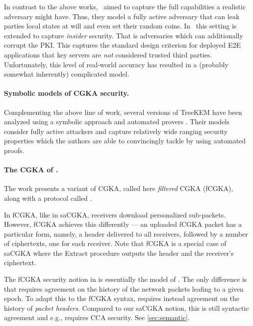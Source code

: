 In contrast to the above works,~\cite{TCC:ACJM20} aimed to capture the full
capabilities a realistic adversary might have. Thus, they model a fully
active adversary that can leak parties local states at will and even set
their random coins. In~\cite{EPRINT:AlwJosMul20} this setting is extended to
capture \emph{insider} security. That is adversaries which can additionally
corrupt the PKI. This captures the standard design criterion for deployed E2E
applications that key servers are \emph{not} considered trusted third
parties. Unfortunately, this level of real-world accuracy has resulted in a
(probably somewhat inherently) complicated model.

\paragraph{Symbolic models of CGKA security.}
Complementing the above line of work, several versions of TreeKEM have been
analyzed using a symbolic approach and automated provers
\cite{bhargavan:hal-02425229}. Their models consider fully active attackers
and capture relatively wide ranging security properties which the authors are
able to convincingly tackle by using automated proofs.

\paragraph{The CGKA of \cite{hashimoto2021cmpke}.}
The work \cite{hashimoto2021cmpke} presents a variant of CGKA, called here \emph{filtered} CGKA (fCGKA), along with a protocol called \protCMPKE.

In fCGKA, like in saCGKA, receivers download personalized sub-packets. However, fCGKA achieves this differently --- an uploaded fCGKA packet has a particular form, namely, a header delivered to all receivers, followed by a number of ciphertexts, one for each receiver. Note that fCGKA is a special case of saCGKA where the Extract procedure outputs the header and the receiver's ciphertext.

The fCGKA security notion in \cite{hashimoto2021cmpke} is essentially the model of \cite{EPRINT:AlwJosMul20}. The only difference is that \cite{EPRINT:AlwJosMul20} requires agreement on the history of the network packets leafing to a given epoch. To adapt this to the fCGKA syntax, \cite{hashimoto2021cmpke} requires instead agreement on the history of \emph{packet headers}. Compared to our saCGKA notion, this is still syntactic agreement and e.g., requires CCA security. See \cref{sec:semantic}.

